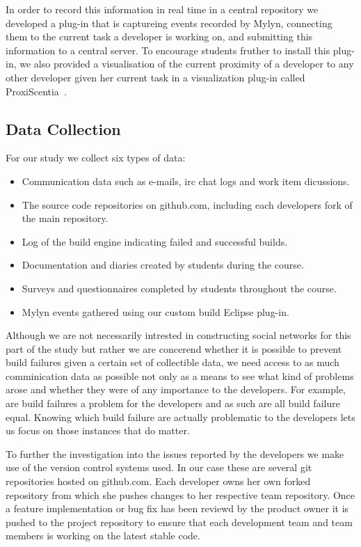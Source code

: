 In order to record this information in real time in a central repository we developed a plug-in that is captureing events recorded by Mylyn, connecting them to the current task a developer is working on, and submitting this information to a central server. 
To encourage students fruther to install this plug-in, we also provided a visualisation of the current proximity of a developer to any other developer given her current task in a visualization plug-in called ProxiScentia~\cite{}.

\subsection{Data Collection}
For our study we collect six types of data:
\begin{itemize}
\item Communication data such as e-mails, irc chat logs and work item dicussions.
\item The source code repositories on github.com, including each developers fork of the main repository.
\item Log of the build engine indicating failed and successful builds.
\item Documentation and diaries created by students during the course.
\item Surveys and questionnaires completed by students throughout the course. 
\item Mylyn events gathered using our custom build Eclipse plug-in.
\end{itemize}

Although we are not necessarily intrested in constructing social networks for this part of the study but rather we are concerend whether it is possible to prevent build failures given a certain set of collectible data, we need access to as much comminication data as possible not only as a means to see what kind of problems arose and whether they were of any importance to the developers.
For example, are build failures a problem for the developers and as such are all build failure equal.
Knowing which build failure are actually problematic to the developers lets us focus on those instances that do matter.

To further the investigation into the issues reported by the developers we make use of the version control systems used.
In our case these are several git repositories hosted on github.com.
Each developer owns her own forked repository from which she pushes changes to her respective team repository.
Once a feature implementation or bug fix has been reviewd by the product owner it is pushed to the project repository to ensure that each development team and team members is working on the latest stable code.

